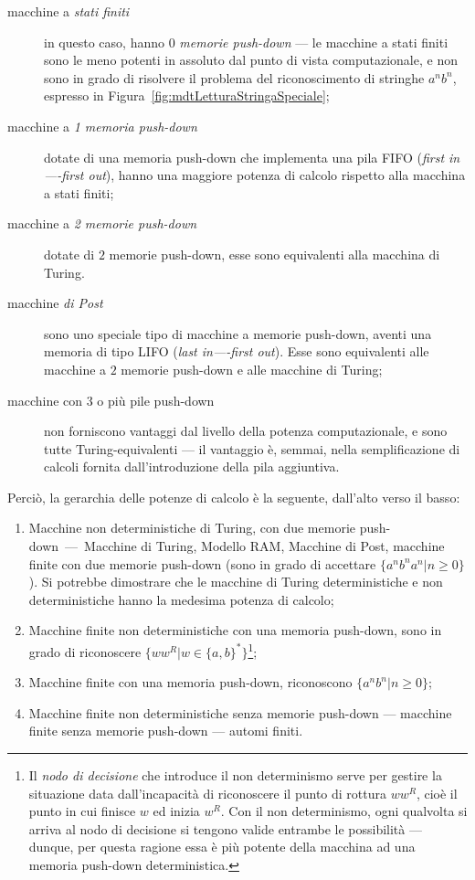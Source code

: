 \documentclass[10pt]{\classname}
\theoremstyle{definition}
\theoremstyle{definition}
\begin{document}
\begin{description}
    \item[macchine a \emph{stati finiti}] in questo caso, hanno $0$
        \emph{memorie push-down} --- le macchine a stati finiti sono le meno
        potenti in assoluto dal punto di vista computazionale, e non sono in
        grado di risolvere il problema del riconoscimento di stringhe $a^n
        b^n$, espresso in Figura~\ref{fig:mdtLetturaStringaSpeciale};
    \item[macchine a \emph{1 memoria push-down}] dotate di una memoria
        push-down che implementa una pila FIFO (\emph{first in----first out}),
        hanno una maggiore potenza di calcolo rispetto alla macchina a stati
        finiti;
    \item[macchine a \emph{2 memorie push-down}] dotate di $2$ memorie
        push-down, esse sono equivalenti alla macchina di Turing.
    \item[macchine \emph{di Post}] sono uno speciale tipo di macchine a memorie
        push-down, aventi una memoria di tipo LIFO (\emph{last in----first
        out}). Esse sono equivalenti alle macchine a $2$ memorie push-down e
        alle macchine di Turing;
    \item[macchine con 3 o più pile push-down] non forniscono vantaggi dal
        livello della potenza computazionale, e sono tutte Turing-equivalenti
        --- il vantaggio è, semmai, nella semplificazione di calcoli fornita
        dall'introduzione della pila aggiuntiva.
\end{description}


Perciò, la gerarchia delle potenze di calcolo è la seguente, dall'alto verso il basso:
\begin{enumerate}
    \item Macchine non deterministiche di Turing, con due memorie
        push-down~---~Macchine di Turing, Modello RAM, Macchine di Post,
        macchine finite con due memorie push-down (sono in grado di accettare
        $\{a^n b^n a^n| n \geq 0\}$). Si potrebbe dimostrare che le macchine di
        Turing deterministiche e non deterministiche hanno la medesima potenza
        di calcolo; 
    \item Macchine finite non deterministiche con una memoria push-down, sono
        in grado di riconoscere $\{w w^R | w\in\{a,b\}^*\}$\footnote{Il
        \emph{nodo di decisione} che introduce il non determinismo serve per
    gestire la situazione data dall'incapacità di riconoscere il punto di
rottura $ww^R$, cioè il punto in cui finisce $w$ ed inizia $w^R$. Con il non
determinismo, ogni qualvolta si arriva al nodo di decisione si tengono valide
entrambe le possibilità --- dunque, per questa ragione essa è più potente della
macchina ad una memoria push-down deterministica.};
    \item Macchine finite con una memoria push-down, riconoscono $\{a^n
        b^n|n\geq 0\}$;
    \item Macchine finite non deterministiche senza memorie push-down ---
        macchine finite senza memorie push-down --- automi finiti.
\end{enumerate}
\end{document}
